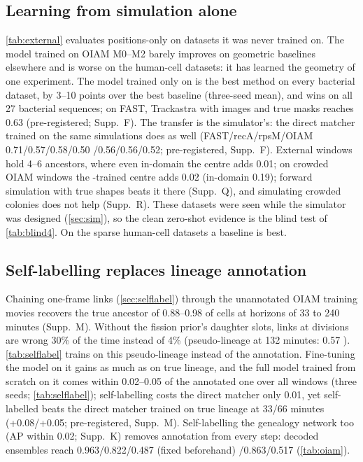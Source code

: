 \subsection{Learning from simulation alone}
\cref{tab:external} evaluates positions-only \ours on datasets it was never trained on.
The model trained on OIAM M0--M2 barely improves on geometric baselines elsewhere and is worse on the human-cell datasets: it has learned the geometry of one experiment.
The model trained only on \rodsim is the best method on every bacterial dataset, by 3--10 points over the best baseline (three-seed mean), and wins on all 27 bacterial sequences; on FAST, Trackastra with images and true masks reaches 0.63 (pre-registered; Supp.~F).
The transfer is the simulator's: the direct matcher trained on the same simulations does as well (FAST/recA/rpsM/OIAM 0.71/0.57/0.58/0.50 /0.56/0.56/0.52; pre-registered, Supp.~F). External windows hold 4--6 ancestors, where even in-domain the centre adds 0.01; on crowded OIAM windows the \rodsim-trained centre adds 0.02 (in-domain 0.19); forward simulation with true shapes beats it there (Supp.~Q), and simulating crowded colonies does not help (Supp.~R).
These datasets were seen while the simulator was designed (\cref{sec:sim}), so the clean zero-shot evidence is the blind test of \cref{tab:blind4}.
On the sparse human-cell datasets a baseline is best.




\subsection{Self-labelling replaces lineage annotation}
Chaining one-frame links (\cref{sec:selflabel}) through the unannotated OIAM training movies recovers the true ancestor of 0.88--0.98 of cells at horizons of 33 to 240 minutes (Supp.~M).
Without the fission prior's daughter slots, links at divisions are wrong 30\% of the time instead of 4\% (pseudo-lineage at 132 minutes: 0.57 ).
\cref{tab:selflabel} trains on this pseudo-lineage instead of the annotation.
Fine-tuning the \rodsim model on it gains as much as on true lineage, and the full model trained from scratch on it comes within 0.02--0.05 of the annotated one over all windows (three seeds; \cref{tab:selflabel}); self-labelling costs the direct matcher only 0.01, yet self-labelled \ours beats the direct matcher trained on true lineage at 33/66 minutes (+0.08/+0.05; pre-registered, Supp.~M).
Self-labelling the genealogy network too (AP within 0.02; Supp.~K) removes annotation from every step: decoded ensembles reach 0.963/0.822/0.487 (fixed beforehand) /0.863/0.517 (\cref{tab:oiam}).


